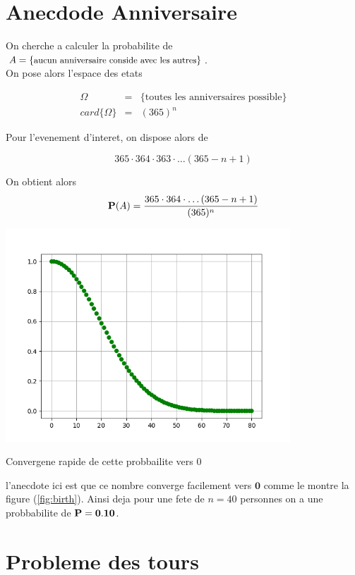 \documentclass[a4paper]{tufte-handout}
\begin{document}
\section{Anecdode Anniversaire}

On cherche a calculer la probabilite  de $A = \{\text{\small aucun anniversaire conside
avec les autres}\}$.\\

On pose alors l'espace des etats 

\begin{eqnarray*}
  \Omega &= & \{\text{toutes les anniversaires possible}\}\\
  card\{\Omega\} &=& (365)^n
\end{eqnarray*}

Pour l'evenement d'interet, on dispose alors de 

$$
365\cdot 364\cdot 363\cdot \ldots (365 - n + 1)
$$

On obtient alors
\begin{equation*}
  \P(A) = \dfrac{365\cdot 364 \cdot \ldots (365 - n + 1)  }{(365)^n} 
\end{equation*}

\begin{marginfigure}
   \centering
   \includegraphics[width=0.8\textwidth]{./birthday.png}
   \caption{Convergene rapide de cette probbailite vers 0}
   \label{fig:birth}
\end{marginfigure}

l'anecdote ici est que ce nombre converge facilement vers $\mathbf{0}$ comme le
montre la figure (\ref{fig:birth}). Ainsi deja pour une fete de $n = 40$ personnes on a une
probbabilite de $\P =\mathbf{0.10} $.

\section{Probleme des tours}
\end{document}
